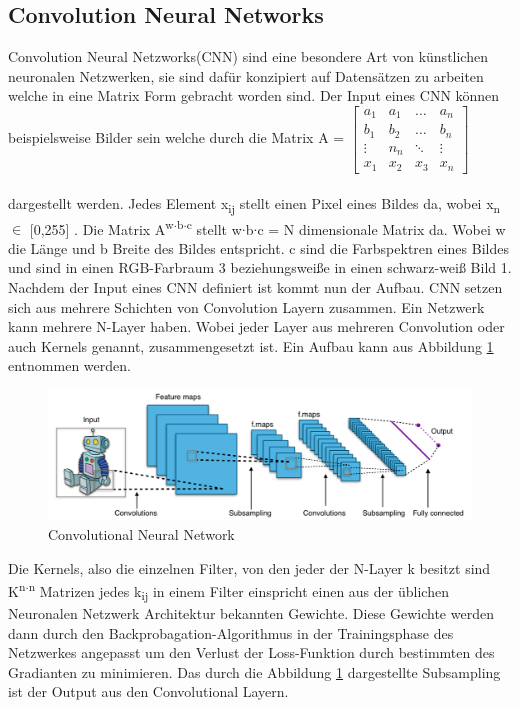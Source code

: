\documentclass{llncs}
\begin{document}
	\subsection{Convolution Neural Networks}

	Convolution Neural Netzworks(CNN) sind eine besondere Art von künstlichen neuronalen Netzwerken, sie sind dafür konzipiert auf Datensätzen zu arbeiten welche in eine Matrix Form gebracht worden sind. Der Input eines CNN können beispielsweise Bilder sein welche durch die Matrix A =
	$
	\begin{bmatrix}
	a_1	& a_1	& \dots	 & a_n     \\
	b_1	& b_2 	& \dots  & b_n	  \\
	\vdots	& n_n 	& \ddots & \vdots \\
	x_1 	& x_2 & x_3	 & x_n
	\end{bmatrix}
	$
	\\\\dargestellt werden. Jedes Element x\textsubscript{ij} stellt einen Pixel eines Bildes da, wobei x\textsubscript{n} $\in$ [0,255] . Die Matrix A\textsuperscript{w$\cdot$b$\cdot$c} stellt w$\cdot$b$\cdot$c = N dimensionale Matrix da. Wobei w die Länge und b Breite des Bildes entspricht. c sind die Farbspektren eines Bildes und sind in einen RGB-Farbraum 3 beziehungsweiße in einen schwarz-weiß Bild 1. Nachdem  der Input eines CNN definiert ist kommt nun der Aufbau. CNN setzen sich aus mehrere Schichten von Convolution Layern zusammen. Ein Netzwerk kann mehrere N-Layer haben. Wobei jeder Layer aus mehreren Convolution oder auch Kernels genannt, zusammengesetzt ist. Ein Aufbau kann aus Abbildung \ref{fig:Bild2} entnommen werden\cite{Grundlagen}.

	\begin{figure}[htbp] 
		\centering
		\includegraphics[width=1.0\textwidth]{convol.png}
		\caption{Convolutional Neural Network}
		\label{fig:Bild2}
	\end{figure}

	Die Kernels, also die einzelnen Filter, von den jeder der N-Layer k besitzt sind K\textsuperscript{n$\cdot$n} Matrizen jedes k\textsubscript{ij} in einem Filter einspricht einen aus der üblichen Neuronalen Netzwerk Architektur bekannten Gewichte. Diese Gewichte werden dann durch den Backprobagation-Algorithmus in der Trainingsphase des Netzwerkes angepasst um den Verlust der Loss-Funktion durch bestimmten des Gradianten zu minimieren. Das durch die Abbildung \ref{fig:Bild2} dargestellte Subsampling ist der Output aus den Convolutional Layern\cite{Grundlagen}. 
\end{document}
